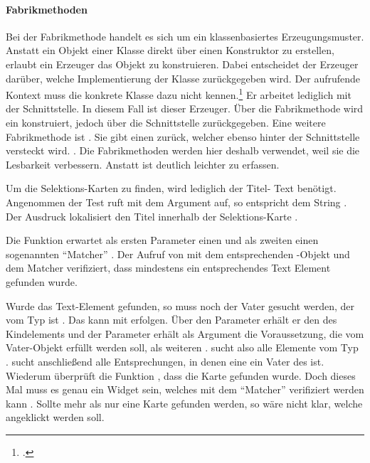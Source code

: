\paragraph{Fabrikmethoden}
Bei der Fabrikmethode handelt es sich um ein klassenbasiertes Erzeugungsmuster.
Anstatt ein Objekt einer Klasse direkt über einen Konstruktor zu erstellen, erlaubt ein Erzeuger das Objekt zu konstruieren.
Dabei entscheidet der Erzeuger darüber, welche Implementierung der Klasse zurückgegeben wird.
Der aufrufende Kontext muss die konkrete Klasse dazu nicht kennen.\footcite[Vgl.][107-116]{gamma2009entwurfsmuster} Er arbeitet lediglich mit der Schnittstelle. In diesem Fall ist  dieser Erzeuger. Über die Fabrikmethode  wird ein  konstruiert, jedoch über die Schnittstelle  zurückgegeben. Eine weitere Fabrikmethode ist . Sie gibt einen  zurück, welcher ebenso hinter der Schnittstelle  versteckt wird. . Die Fabrikmethoden werden hier deshalb verwendet, weil sie die Lesbarkeit verbessern. Anstatt  ist  deutlich leichter zu erfassen.



Um die Selektions-Karten zu finden, wird lediglich der Titel- Text benötigt.
Angenommen der Test ruft  mit dem Argument  auf, so entspricht  dem String . Der Ausdruck  lokalisiert den Titel innerhalb der Selektions-Karte .

Die Funktion  erwartet als ersten Parameter einen  und als zweiten einen sogenannten \enquote{Matcher} .
Der Aufruf von  mit dem entsprechenden -Objekt und dem Matcher  verifiziert, dass mindestens ein entsprechendes Text Element gefunden wurde.

Wurde das Text-Element gefunden, so muss noch der Vater gesucht werden, der vom Typ  ist .
Das kann mit  erfolgen. Über den Parameter  erhält er den  des Kindelements und der Parameter  erhält als Argument die Voraussetzung, die vom Vater-Objekt erfüllt werden soll, als weiteren .  sucht also alle Elemente vom Typ .  sucht anschließend alle Entsprechungen, in denen eine  ein Vater des  ist. Wiederum überprüft die Funktion , dass die Karte gefunden wurde. Doch dieses Mal muss es genau ein Widget sein, welches mit dem \enquote{Matcher}  verifiziert werden kann . Sollte mehr als nur eine Karte gefunden werden, so wäre nicht klar, welche angeklickt werden soll.

